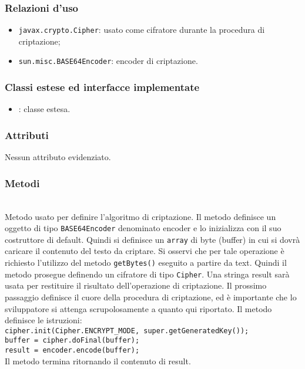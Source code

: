 \subsubsection*{Relazioni d'uso}
\begin{itemize}
	\item \texttt{javax.crypto.Cipher}: usato come cifratore durante la procedura di criptazione;
	\item \texttt{sun.misc.BASE64Encoder}: encoder di criptazione.
\end{itemize}

\subsubsection*{Classi estese ed interfacce implementate}

\begin{itemize}
	\item {}: classe estesa.
\end{itemize}

\subsubsection*{Attributi}

Nessun attributo evidenziato.

\subsubsection*{Metodi}
\begin{description}

	\item{}\\
	Metodo usato per definire l'algoritmo di criptazione. Il metodo definisce un oggetto di tipo \texttt{BASE64Encoder} denominato encoder e lo inizializza con il suo costruttore di default. Quindi si definisce un \texttt{array} di byte (buffer) in cui si dovrà caricare il contenuto del testo da criptare. Si osservi che per tale operazione è richiesto l'utilizzo del metodo \texttt{getBytes()} eseguito a partire da text. Quindi il metodo prosegue definendo  un cifratore di tipo \texttt{Cipher}. Una stringa result sarà usata per restituire il risultato dell'operazione di criptazione. Il prossimo passaggio definisce il cuore della procedura di criptazione, ed è importante che lo sviluppatore si attenga scrupolosamente a quanto qui riportato. Il metodo definisce le istruzioni:\\
	
	\verb|cipher.init(Cipher.ENCRYPT_MODE, super.getGeneratedKey());|\\
	\verb|buffer = cipher.doFinal(buffer);|\\
	\verb|result = encoder.encode(buffer);|\\
	
	Il metodo termina ritornando il contenuto di result.
	
\end{description}

